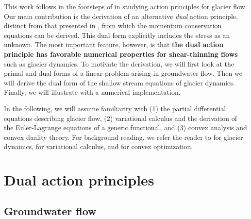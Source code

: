 \documentclass{article}
\theoremstyle{definition}
\theoremstyle{plain}
\begin{document}
This work follows in the footsteps of \citet{dukowicz2010consistent} in studying action principles for glacier flow.
Our main contribution is the derivation of an alternative \emph{dual} action principle, distinct from that presented in \citet{dukowicz2010consistent}, from which the momentum conservation equations can be derived.
This dual form explicitly includes the stress as an unknown.
The most important feature, however, is that \textbf{the dual action principle has favorable numerical properties for shear-thinning flows} such as glacier dynamics.
To motivate the derivation, we will first look at the primal and dual forms of a linear problem arising in groundwater flow.
Then we will derive the dual form of the shallow stream equations of glacier dynamics.
Finally, we will illustrate with a numerical implementation.

In the following, we will assume familiarity with (1) the partial differential equations describing glacier flow, (2) variational calculus and the derivation of the Euler-Lagrange equations of a generic functional, and (3) convex analysis and convex duality theory.
For background reading, we refer the reader to \citet{greve2009dynamics} for glacier dynamics, \citet{weinstock1974calculus} for variational calculus, and \citet{boyd2004convex} for convex optimization.


\section{Dual action principles}

\subsection{Groundwater flow}
\end{document}
